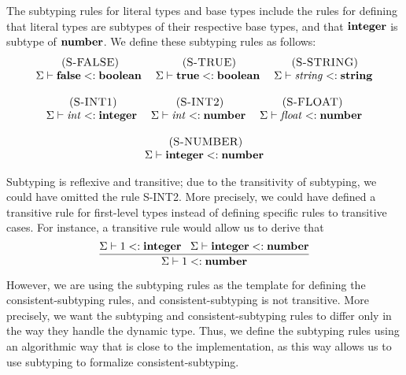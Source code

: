 The subtyping rules for literal types and base types include the rules
for defining that literal types are subtypes of their respective base types,
and that $\mathbf{integer}$ is subtype of $\mathbf{number}$.
We define these subtyping rules as follows:
\[
\begin{array}{c}
\begin{array}{c}
\; (\textsc{S-FALSE})\\
\Sigma \vdash \mathbf{false} <: \mathbf{boolean}
\end{array}
\;
\begin{array}{c}
\; (\textsc{S-TRUE})\\
\Sigma \vdash \mathbf{true} <: \mathbf{boolean}
\end{array}
\;
\begin{array}{c}
\; (\textsc{S-STRING})\\
\Sigma \vdash {\it string} <: \mathbf{string}
\end{array}
\\ \\
\begin{array}{c}
\; (\textsc{S-INT1})\\
\Sigma \vdash {\it int} <: \mathbf{integer}
\end{array}
\;
\begin{array}{c}
\; (\textsc{S-INT2})\\
\Sigma \vdash {\it int} <: \mathbf{number}
\end{array}
\;
\begin{array}{c}
\; (\textsc{S-FLOAT})\\
\Sigma \vdash {\it float} <: \mathbf{number}
\end{array}
\\ \\
\begin{array}{c}
\; (\textsc{S-NUMBER})\\
\Sigma \vdash \mathbf{integer} <: \mathbf{number}
\end{array}
\end{array}
\]

Subtyping is reflexive and transitive;
due to the transitivity of subtyping, we could have omitted
the rule \textsc{S-INT2}.
More precisely, we could have defined a transitive rule for first-level
types instead of defining specific rules to transitive cases.
For instance, a transitive rule would allow us to derive that
\[
\dfrac{\Sigma \vdash 1 <: \mathbf{integer} \;\;\;
       \Sigma \vdash \mathbf{integer} <: \mathbf{number}}
      {\Sigma \vdash 1 <: \mathbf{number}}
\]

However, we are using the subtyping rules as the template for defining
the consistent-subtyping rules, and consistent-subtyping is not
transitive.
More precisely, we want the subtyping and consistent-subtyping rules
to differ only in the way they handle the dynamic type.
Thus, we define the subtyping rules using an algorithmic
way that is close to the implementation, as this way allows us to use
subtyping to formalize consistent-subtyping.

